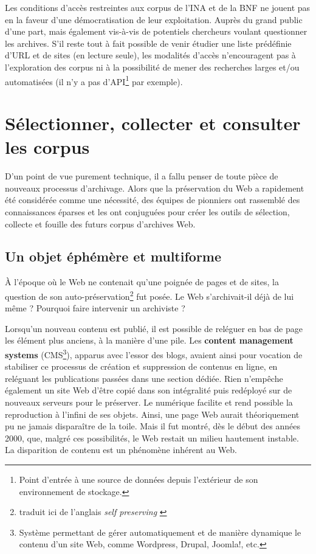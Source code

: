 \documentclass[symmetric,justified,marginals=raggedouter]{tufte-book}
\begin{document}
\noindent Les conditions d'accès restreintes aux corpus de l'INA et de la BNF ne jouent pas en la faveur d'une démocratisation de leur exploitation. Auprès du grand public d'une part, mais également vis-à-vis de potentiels chercheurs voulant questionner les archives. S'il reste tout à fait possible de venir étudier une liste prédéfinie d'URL et de sites (en lecture seule), les modalités d'accès n'encouragent pas à l'exploration des corpus ni à la possibilité de mener des recherches larges et/ou automatisées (il n'y a pas d'API\footnote{\RaggedOuter Point d'entrée à une source de données depuis l'extérieur de son environnement de stockage.} par exemple). 

\section{Sélectionner, collecter et consulter les corpus}
\label{sec:3_constituer}

\noindent D'un point de vue purement technique, il a fallu penser de toute pièce de nouveaux processus d'archivage. Alors que la préservation du Web a rapidement été considérée comme une nécessité, des équipes de pionniers ont rassemblé des connaissances éparses et les ont conjuguées pour créer les outils de sélection, collecte et fouille des futurs corpus d'archives Web. 

\subsection{Un objet éphémère et multiforme}  
 
\noindent À l'époque où le Web ne contenait qu'une poignée de pages et de sites, la question de son auto-préservation\footnote{\RaggedOuter traduit ici de l'anglais \textit{self preserving} \citep{spinellis_decay_2003}} fut posée. Le Web s'archivait-il déjà de lui même ? Pourquoi faire intervenir un archiviste ?

Lorsqu'un nouveau contenu est publié, il est possible de reléguer en bas de page les élément plus anciens, à la manière d'une pile. Les \textbf{content management systems} (CMS\footnote{\RaggedOuter Système permettant de gérer automatiquement et de manière dynamique le contenu d'un site Web, comme Wordpress, Drupal, Joomla!, etc.}), apparus avec l'essor des blogs, avaient ainsi pour vocation de stabiliser ce processus de création et suppression de contenus en ligne, en reléguant les publications passées dans une section dédiée. Rien n'empêche également un site Web d'être copié dans son intégralité puis redéployé sur de nouveaux serveurs pour le préserver. Le numérique facilite et rend possible la reproduction à l'infini de ses objets. Ainsi, une page Web aurait théoriquement pu ne jamais disparaître de la toile. Mais il fut montré, dès le début des années 2000, que, malgré ces possibilités, le Web restait un milieu hautement instable. La disparition de contenu est un phénomène inhérent au Web. 
\end{document}
